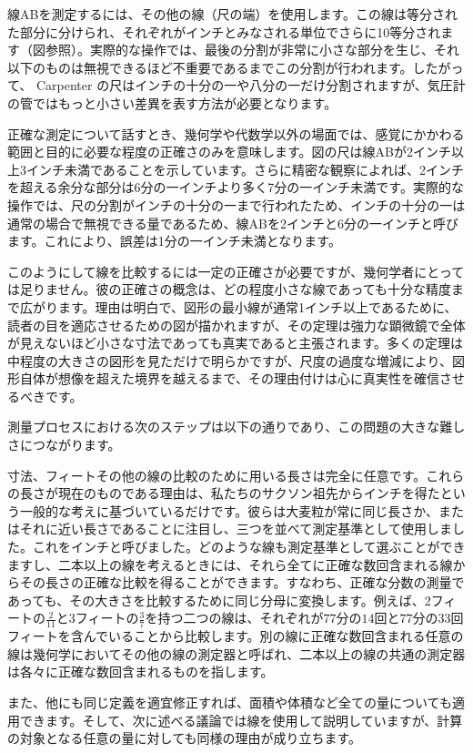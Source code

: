 \documentclass[a4paper,11pt,openany]{ltjsbook}
\begin{document}
線ABを測定するには、その他の線（尺の端）を使用します。この線は等分された部分に分けられ、それぞれがインチとみなされる単位でさらに10等分されます（図参照）。実際的な操作では、最後の分割が非常に小さな部分を生じ、それ以下のものは無視できるほど不重要であるまでこの分割が行われます。したがって、 Carpenter の尺はインチの十分の一や八分の一だけ分割されますが、気圧計の管ではもっと小さい差異を表す方法が必要となります。

正確な測定について話すとき、幾何学や代数学以外の場面では、感覚にかかわる範囲と目的に必要な程度の正確さのみを意味します。図の尺は線ABが2インチ以上3インチ未満であることを示しています。さらに精密な観察によれば、2インチを超える余分な部分は6分の一インチより多く7分の一インチ未満です。実際的な操作では、尺の分割がインチの十分の一まで行われたため、インチの十分の一は通常の場合で無視できる量であるため、線ABを2インチと6分の一インチと呼びます。これにより、誤差は1分の一インチ未満となります。

このようにして線を比較するには一定の正確さが必要ですが、幾何学者にとっては足りません。彼の正確さの概念は、どの程度小さな線であっても十分な精度まで広がります。理由は明白で、図形の最小線が通常1インチ以上であるために、読者の目を適応させるための図が描かれますが、その定理は強力な顕微鏡で全体が見えないほど小さな寸法であっても真実であると主張されます。多くの定理は中程度の大きさの図形を見ただけで明らかですが、尺度の過度な増減により、図形自体が想像を超えた境界を越えるまで、その理由付けは心に真実性を確信させるべきです。

測量プロセスにおける次のステップは以下の通りであり、この問題の大きな難しさにつながります。

寸法、フィートその他の線の比較のために用いる長さは完全に任意です。これらの長さが現在のものである理由は、私たちのサクソン祖先からインチを得たという一般的な考えに基づいているだけです。彼らは大麦粒が常に同じ長さか、またはそれに近い長さであることに注目し、三つを並べて測定基準として使用しました。これをインチと呼びました。どのような線も測定基準として選ぶことができますし、二本以上の線を考えるときには、それら全てに正確な数回含まれる線からその長さの正確な比較を得ることができます。すなわち、正確な分数の測量であっても、その大きさを比較するために同じ分母に変換します。例えば、2フィートの$\frac{2}{11}$と3フィートの$\frac{3}{7}$を持つ二つの線は、それぞれが$77$分の$14$回と$77$分の$33$回フィートを含んでいることから比較します。別の線に正確な数回含まれる任意の線は幾何学においてその他の線の測定器と呼ばれ、二本以上の線の共通の測定器は各々に正確な数回含まれるものを指します。

また、他にも同じ定義を適宜修正すれば、面積や体積など全ての量についても適用できます。そして、次に述べる議論では線を使用して説明していますが、計算の対象となる任意の量に対しても同様の理由が成り立ちます。
\end{document}
